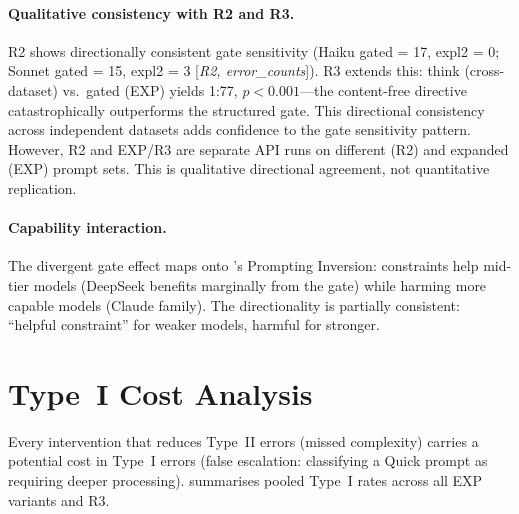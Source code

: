\documentclass[11pt,a4paper]{article}
\begin{document}
\paragraph{Qualitative consistency with R2 and R3.}
R2 shows directionally consistent gate sensitivity (Haiku \textsf{gated} = 17,
\textsf{expl2} = 0; Sonnet \textsf{gated} = 15, \textsf{expl2} = 3
[\emph{R2, error\_counts}]).  R3 extends this: \textsf{think} (cross-dataset)
vs.\ \textsf{gated} (EXP) yields 1:77, $p < 0.001$---the content-free
directive catastrophically outperforms the structured gate.  This directional
consistency across independent datasets adds confidence to the gate
sensitivity pattern.  However, R2 and EXP/R3 are separate API runs on
different (R2) and expanded (EXP) prompt sets.  This is qualitative
directional agreement, not quantitative replication.

\paragraph{Capability interaction.}
The divergent gate effect maps onto \citet{Khan2025}'s Prompting Inversion:
constraints help mid-tier models (DeepSeek benefits marginally from the gate)
while harming more capable models (Claude family).  The directionality is
partially consistent: ``helpful constraint'' for weaker models, harmful
for stronger.

\section{Type~I Cost Analysis}
\label{sec:typei}

Every intervention that reduces Type~II errors (missed complexity) carries
a potential cost in Type~I errors (false escalation: classifying a Quick
prompt as requiring deeper processing).   summarises pooled
Type~I rates across all EXP variants and R3.
\end{document}
